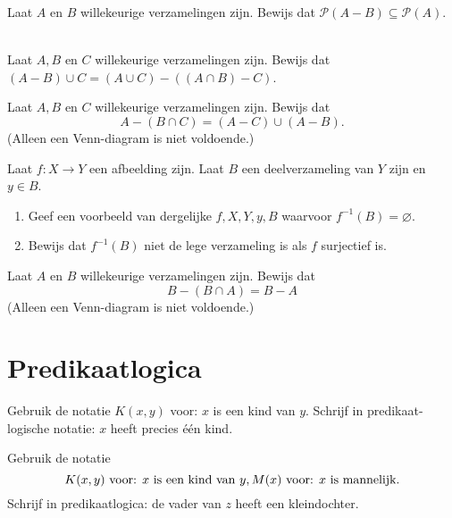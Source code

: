 \begin{exercise}
Laat $A$ en $B$ willekeurige verzamelingen zijn. Bewijs dat $\mathcal{P}(A-B)\subseteq\mathcal{P}(A)$.
\end{exercise}

\begin{exercise}[Pittig!]\mbox{}\\
Laat $A, B$ en $C$ willekeurige verzamelingen zijn. Bewijs dat $(A-B)\cup C=(A\cup C)-((A\cap B) - C)$.
\end{exercise}

\begin{exercise}
Laat $A, B$ en $C$ willekeurige verzamelingen zijn. Bewijs dat
$$A-(B\cap C)=(A-C)\cup(A-B).$$
(Alleen een Venn-diagram is niet voldoende.)
\end{exercise}

\begin{exercise}
Laat $f:X\rightarrow Y$ een afbeelding zijn. Laat $B$ een deelverzameling van $Y$ zijn en $y\in B$.
\begin{enumerate}[label=\alph*.]
    \item Geef een voorbeeld van dergelijke $f, X, Y, y, B$ waarvoor $f^{-1}(B)=\varnothing$.
    \item Bewijs dat $f^{-1}(B)$ niet de lege verzameling is als $f$ surjectief is.
\end{enumerate}
\end{exercise}

\begin{exercise}
Laat $A$ en $B$ willekeurige verzamelingen zijn. Bewijs dat
$$B-(B\cap A)=B-A$$
(Alleen een Venn-diagram is niet voldoende.)
\end{exercise}

\section{Predikaatlogica}
\setcounter{exerciseT}{0}
\begin{exercise}
Gebruik de notatie $K(x,y)$ voor: $x$ is een kind van $y$. Schrijf in predikaat-logische notatie: $x$ heeft precies \'e\'en kind.
\end{exercise}

\begin{exercise}
Gebruik de notatie
$$K(x,y)\text{ voor: $x$ is een kind van $y$},\\
M(x)\text{ voor: $x$ is mannelijk.}$$
Schrijf in predikaatlogica: de vader van $z$ heeft een kleindochter.
\end{exercise}

